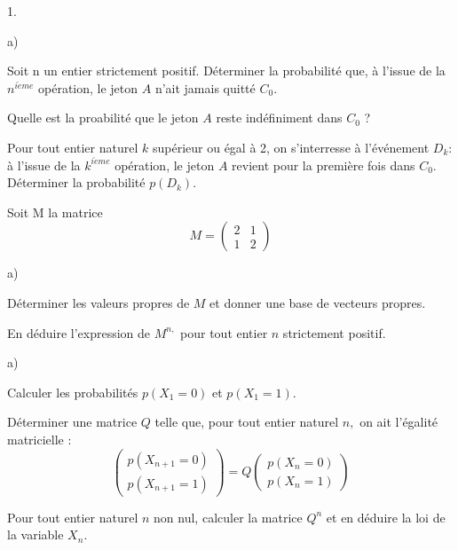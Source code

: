 \documentclass[11pt]{article}%
\begin{document}
\begin{noliste}{1.}
 \setlength{\itemsep}{4mm}
\item 
\begin{noliste}{a)}
 \setlength{\itemsep}{2mm}
\item Soit n un entier strictement positif. Déterminer la
probabilité que, à l'issue de la $n^{i\grave{e}me}$ opération,
le jeton $A$ n'ait jamais quitté $C_{0}.$


\item Quelle est la proabilité que le jeton $A$ reste indéfiniment
dans $C_{0}$ ?
\end{noliste}


\item Pour tout entier naturel $k$ supérieur ou égal à 2, on
s'interresse à l'événement $D_{k} :$ à l'issue de la $k^{i\grave{e}me}$
opération, le jeton $A$ revient pour la première fois
dans $C_{0}.$ Déterminer la probabilité $p\left( D_{k}\right) $.

\item Soit M la matrice 
\[
M = \left( 
\begin{array}{ll}
2 & 1 \\
1 & 2
\end{array}
\right) 
\]


\begin{noliste}{a)}
 \setlength{\itemsep}{2mm}
\item Déterminer les valeurs propres de $M$ et donner une base de
vecteurs propres.


\item En déduire l'expression de $M^{n,}$ pour tout entier $n$
strictement positif.
\end{noliste}


\item 
\begin{noliste}{a)}
 \setlength{\itemsep}{2mm}
\item Calculer les probabilités $p\left( X_{1} = 0\right) $ et $p\left(
X_{1} = 1\right).$


\item Déterminer une matrice $Q$ telle que, pour tout entier naturel
$n,
$ on ait l'égalité matricielle : 
\[
\left( 
\begin{array}{l}
p(X_{n + 1} = 0) \\
p(X_{n + 1} = 1)
\end{array}
\right) = Q\left( 
\begin{array}{l}
p(X_{n} = 0) \\
p(X_{n} = 1)
\end{array}
\right) 
\]


\item Pour tout entier naturel $n$ non nul, calculer la matrice $Q^{n}$
et
en déduire la loi de la variable $X_{n}.$
\end{noliste}
\end{noliste}
\end{document}
